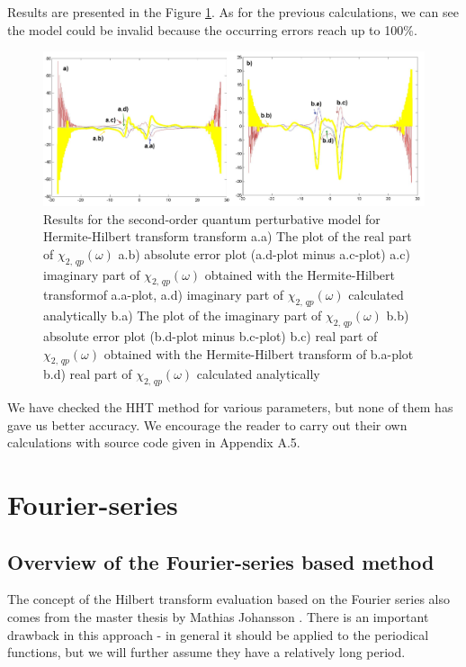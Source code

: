 \documentclass[12pt,twoside,a4paper]{article}
\numberwithin{equation}{subsection}
\numberwithin{figure}{subsection}
\begin{document}
Results are presented in the Figure \ref{fig:hht_qp2}. As for the previous calculations, we can see the model could be invalid
because the occurring errors reach up to 100\%.

\begin{figure} 
  \includegraphics[width=150mm]{img/hht_qp2.png}
  \caption{Results for the second-order quantum perturbative model for Hermite-Hilbert transform transform
     a.a) The plot of the real part of ${\chi_{2, \,qp}}(\omega )$
     a.b) absolute error plot (a.d-plot minus a.c-plot)
     a.c) imaginary part of ${\chi_{2, \,qp}}(\omega )$ obtained with the Hermite-Hilbert transformof a.a-plot, 
     a.d) imaginary part of ${\chi_{2, \,qp}}(\omega )$ calculated analytically 
     b.a) The plot of the imaginary part of ${\chi_{2, \,qp}}(\omega )$ 
     b.b) absolute error plot (b.d-plot minus b.c-plot)
     b.c) real part of ${\chi_{2, \,qp}}(\omega )$ obtained with the Hermite-Hilbert transform of b.a-plot 
     b.d) real part of $\chi_{2, \,qp} (\omega )$ calculated analytically 
     \label{fig:hht_qp2}
     }
\end{figure} 

We have checked the HHT method for various parameters, but none of them has gave us better accuracy. We
encourage the reader to carry out their own calculations with source code given in Appendix A.5.

\section{Fourier-series} \label{chap:fourier}

\subsection{Overview of the Fourier-series based method}  \label{chap:fourier_overview}

The concept of the Hilbert transform evaluation based on the Fourier series also comes from the master thesis by Mathias Johansson
\cite{johansson_hilbert}. There is an important drawback in this approach - in general it should be applied to the periodical
functions, but we will further assume they have a relatively long period. 
\end{document}
